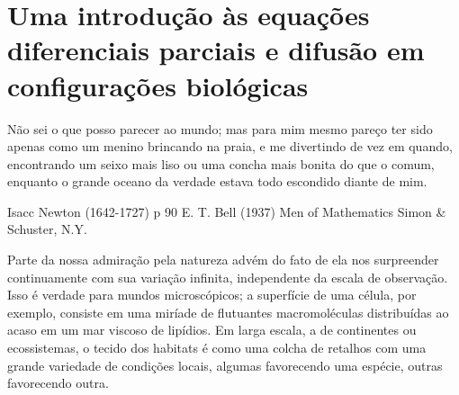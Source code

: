 {{\chapter{Uma introdução às equações diferenciais parciais e difusão em configurações biológicas}}}

\begin{citacao}
{{Não sei o que posso parecer ao mundo; mas para mim mesmo pareço ter sido apenas como um menino brincando na praia, e me divertindo de vez em quando, encontrando um seixo mais liso ou uma concha mais bonita do que o comum, enquanto o grande oceano da verdade estava todo escondido diante de mim.}}

Isacc Newton (1642-1727) p 90 E. T. Bell (1937) Men of Mathematics Simon \& Schuster, N.Y.
\end{citacao}

{{Parte da nossa admiração pela natureza advém do fato de ela nos surpreender continuamente com sua variação infinita, independente da escala de observação. Isso é verdade para mundos microscópicos; a superfície de uma célula, por exemplo, consiste em uma miríade de flutuantes macromoléculas distribuídas ao acaso em um mar viscoso de lipídios. Em larga escala, a de continentes ou ecossistemas, o tecido dos habitats é como uma colcha de retalhos com uma grande variedade de condições locais, algumas favorecendo uma espécie, outras favorecendo outra.}}

